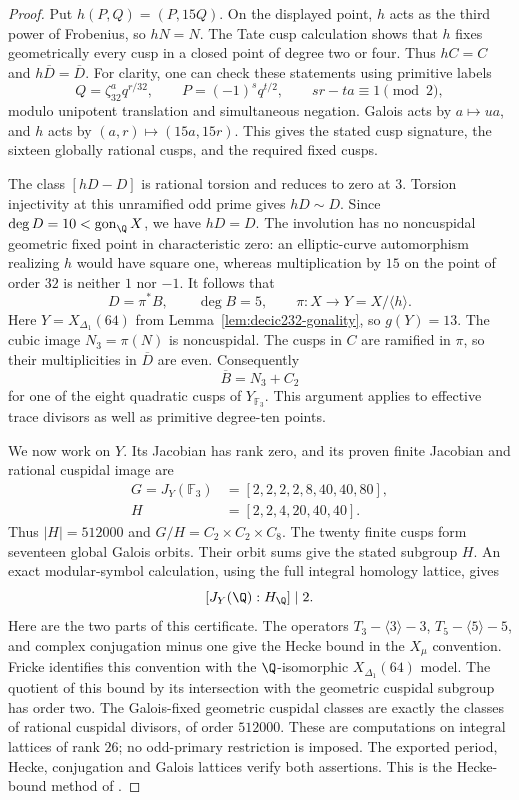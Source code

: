 \begin{proof}
Put $h(P,Q)=(P,15Q)$. On the displayed point, $h$ acts as the
third power of Frobenius, so $hN=N$.
The Tate cusp calculation shows that $h$ fixes geometrically every
cusp in a closed point of degree two or four. Thus $hC=C$ and
$h\overline D=\overline D$.
For clarity, one can check these statements using primitive labels
\[
 Q=\zeta_{32}^a q^{r/32},\qquad P=(-1)^s q^{t/2},
 \qquad sr-ta\equiv1\pmod2,
\]
modulo unipotent translation and simultaneous negation.
Galois acts by $a\mapsto ua$, and $h$ acts by
$(a,r)\mapsto(15a,15r)$. This gives the stated cusp signature,
the sixteen globally rational cusps, and the required fixed cusps.

The class $[hD-D]$ is rational torsion and reduces to zero at $3$.
Torsion injectivity at this unramified odd prime gives $hD\sim D$.
Since $\deg D=10<\operatorname{gon}_{\Q}X$, we have $hD=D$.
The involution has no noncuspidal geometric fixed point in
characteristic zero: an elliptic-curve automorphism realizing $h$
would have square one, whereas multiplication by $15$ on the
point of order $32$ is neither $1$ nor $-1$.
It follows that
\[
 D=\pi^*B,\qquad \deg B=5,
 \qquad \pi:X\longrightarrow Y=X/\langle h\rangle.
\]
Here $Y=X_{\Delta_1}(64)$ from
Lemma~\ref{lem:decic232-gonality}, so $g(Y)=13$.
The cubic image $N_3=\pi(N)$ is noncuspidal.
The cusps in $C$ are ramified in $\pi$, so their multiplicities
in $\overline D$ are even. Consequently
\[
 \overline B=N_3+C_2
\]
for one of the eight quadratic cusps of $Y_{\mathbb F_3}$.
This argument applies to effective trace divisors as well as
primitive degree-ten points.

We now work on $Y$. Its Jacobian has rank zero, and its proven
finite Jacobian and rational cuspidal image are
\[
\begin{aligned}
 G=J_Y(\mathbb F_3)&=[2,2,2,2,8,40,40,80],\\
 H&=[2,2,4,20,40,40].
\end{aligned}
\]
Thus $|H|=512000$ and $G/H=C_2\times C_2\times C_8$.
The twenty finite cusps form seventeen global Galois orbits.
Their orbit sums give the stated subgroup $H$.
An exact modular-symbol calculation, using the full integral
homology lattice, gives
\[
 [J_Y(\Q):H_\Q]\mid2.
\]
Here are the two parts of this certificate. The operators
$T_3-\langle3\rangle-3$, $T_5-\langle5\rangle-5$, and complex
conjugation minus one give the Hecke bound in the $X_\mu$
convention. Fricke identifies this convention with the
$\Q$-isomorphic $X_{\Delta_1}(64)$ model.
The quotient of this bound by its intersection with the geometric
cuspidal subgroup has order two. The Galois-fixed geometric
cuspidal classes are exactly the classes of rational cuspidal
divisors, of order $512000$.
These are computations on integral lattices of rank $26$;
no odd-primary restriction is imposed.
The exported period, Hecke, conjugation and Galois lattices verify
both assertions. This is the Hecke-bound method of
\cite[Section~4.2]{DEHMZ}.


\end{proof}
